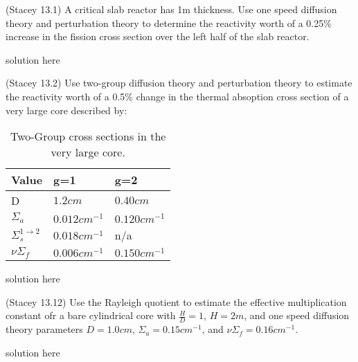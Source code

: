 \documentclass[12pts]{exam}
\begin{document}
\begin{questions}

        \question[30] 
        (Stacey 13.1)
        A critical slab reactor has 1m thickness. 
        Use one speed diffusion theory and perturbation theory to 
        determine the reactivity worth of a 0.25\% increase in the fission 
        cross section over the left half of the slab reactor.
        \begin{solution}
                solution here
        \end{solution}

        
        \question[40] 
        (Stacey 13.2)
        Use two-group diffusion theory and perturbation theory to estimate the 
        reactivity worth of a 0.5\% change in the thermal absoption  cross 
        section of a very large core described by:
        
        \begin{table}[h!]
                \centering
                \begin{tabular}{lll}
                        \hline
                        \textbf{Value} & \textbf{g=1} & \textbf{g=2}\\
                        \hline
                        D & $1.2cm$ &  $0.40cm$\\
                        $\Sigma_a$ & $0.012cm^{-1}$ & $0.120cm^{-1}$ \\
                        $\Sigma_s^{1\rightarrow 2}$& $0.018cm^{-1}$ &  n/a \\
                        $\nu\Sigma_f$ & $0.006cm^{-1}$ & $0.150cm^{-1}$\\
                        \hline
                \end{tabular}
                \caption{Two-Group cross sections in the very large core.}
                \label{tab:prob2}
        \end{table}

        \begin{solution}
                solution here
        \end{solution}


        \question[30]
        (Stacey 13.12)
        Use the Rayleigh quotient to estimate the effective 
        multiplication constant ofr a bare cylindrical core with $\frac{H}{D} 
        =1$, $H=2m$, and one speed diffusion theory parameters $D=1.0cm$, 
        $\Sigma_a=0.15cm^{-1}$, and $\nu\Sigma_f=0.16cm^{-1}$. 
        \begin{solution}
                solution here
        \end{solution}


\end{questions}



%
%
\end{document}
